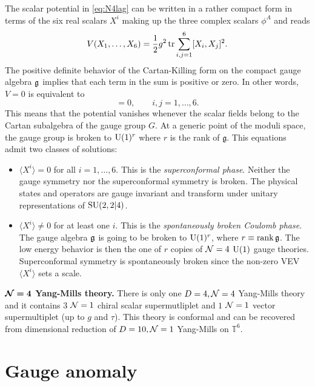         The scalar potential in \eqref{eq:N4lag} can be written in a rather compact form in terms of the six real scalars $X^i$ making up the three complex scalars $\phi^A$ and reads
        \begin{equation}
            V(X_1,\dots,X_6) = \frac{1}{2}g^2\tr\sum^6_{i,j=1}[X_i,X_j]^2.
        \end{equation}
        The positive definite behavior of the Cartan-Killing form on the compact gauge algebra $\mathfrak{g}$ implies that each term in the sum is positive or zero. In other words, $V=0$ is equivalent to
        \begin{equation}
            [X^i,X^j]=0,\qquad i,j=1,\dots,6.
        \end{equation}
        This means that the potential vanishes whenever the scalar fields belong to the Cartan subalgebra of the gauge group $G$. At a generic point of the moduli space, the gauge group is broken to $\text{U}(1)^r$ where $r$ is the rank of $\mathfrak{g}$.
        This equations admit two classes of solutions:
        \begin{itemize}
            \item $\langle X^i\rangle=0$ for all $i=1,\dots,6$. This is the \emph{superconformal phase}. Neither the gauge symmetry nor the superconformal symmetry is broken. The physical states and operators are gauge invariant and transform under
            unitary representations of $\text{SU}(2,2|4)$.
            \item  $\langle X^i\rangle\neq0$ for at least one $i$. This is the \emph{spontaneously broken Coulomb phase}. The gauge algebra $\mathfrak{g}$ is going to be broken to $\text{U}(1)^r$, where $r\equiv\rank\mathfrak{g}$. The low energy behavior is then the one of $r$ copies of $\mathcal{N}=4$ $\text{U}(1)$ gauge theories. Superconformal symmetry is spontaneously broken since the non-zero VEV $\langle X^i\rangle$ sets a scale.
        \end{itemize}

        \begin{result}
            \textbf{$\boldsymbol{\mathcal{N}=4}$ Yang-Mills theory.} There is only one $D=4,\mathcal{N}=4$ Yang-Mills theory and it contains $3$ $\mathcal{N}=1$ chiral scalar supermutliplet and $1$ $\mathcal{N}=1$ vector supermultiplet (up to $g$ and $\tau$). This theory is conformal and can be recovered from dimensional reduction of $D=10,\mathcal{N}=1$ Yang-Mills on $\mathbb{T}^6$.
        \end{result}

\section{Gauge anomaly}\label{sec:anomalies}

